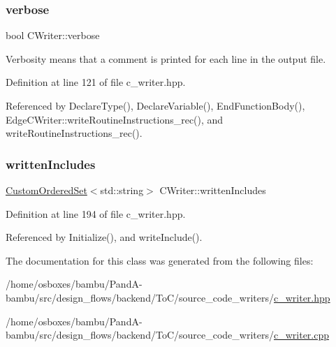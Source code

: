\mbox{\label{classCWriter_a8d5b6fe4a045d7e9ca997a566274cdb5}} 
\subsubsection{\texorpdfstring{verbose}{verbose}}
{\footnotesize\ttfamily bool C\+Writer\+::verbose\hspace{0.3cm}{\ttfamily [protected]}}



Verbosity means that a comment is printed for each line in the output file. 



Definition at line 121 of file c\+\_\+writer.\+hpp.



Referenced by Declare\+Type(), Declare\+Variable(), End\+Function\+Body(), Edge\+C\+Writer\+::write\+Routine\+Instructions\+\_\+rec(), and write\+Routine\+Instructions\+\_\+rec().

\mbox{\label{classCWriter_a91e5847cc31c900423dce81b131992ea}} 
\subsubsection{\texorpdfstring{written\+Includes}{writtenIncludes}}
{\footnotesize\ttfamily \hyperlink{classCustomOrderedSet}{Custom\+Ordered\+Set}$<$std\+::string$>$ C\+Writer\+::written\+Includes\hspace{0.3cm}{\ttfamily [protected]}}



Definition at line 194 of file c\+\_\+writer.\+hpp.



Referenced by Initialize(), and write\+Include().



The documentation for this class was generated from the following files\+:\begin{DoxyCompactItemize}
\item 
/home/osboxes/bambu/\+Pand\+A-\/bambu/src/design\+\_\+flows/backend/\+To\+C/source\+\_\+code\+\_\+writers/\hyperlink{c__writer_8hpp}{c\+\_\+writer.\+hpp}\item 
/home/osboxes/bambu/\+Pand\+A-\/bambu/src/design\+\_\+flows/backend/\+To\+C/source\+\_\+code\+\_\+writers/\hyperlink{c__writer_8cpp}{c\+\_\+writer.\+cpp}\end{DoxyCompactItemize}
